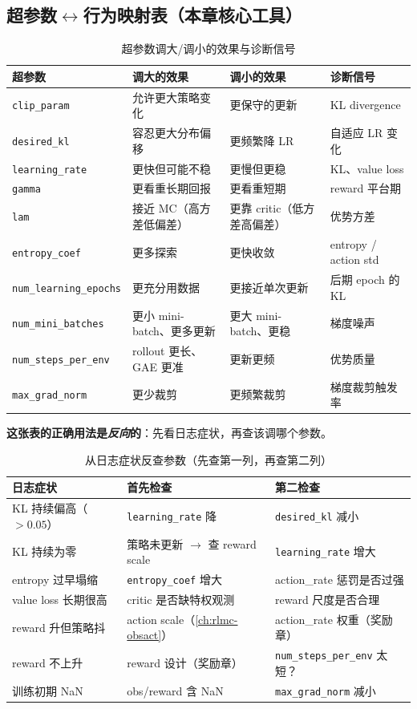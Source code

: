 \subsection{超参数\texorpdfstring{$\leftrightarrow$}{<->}行为映射表（本章核心工具）}

\begin{table}[H]
\centering
\caption{超参数调大/调小的效果与诊断信号}
\label{tab:rlmc-param-behavior}
\begin{tabular}{p{2.6cm}p{3.0cm}p{3.0cm}p{2.6cm}}
\hline
超参数 & 调大的效果 & 调小的效果 & 诊断信号 \\
\hline
\verb|clip_param| & 允许更大策略变化 & 更保守的更新 & KL divergence \\
\verb|desired_kl| & 容忍更大分布偏移 & 更频繁降 LR & 自适应 LR 变化 \\
\verb|learning_rate| & 更快但可能不稳 & 更慢但更稳 & KL、value loss \\
\verb|gamma| & 更看重长期回报 & 更看重短期 & reward 平台期 \\
\verb|lam| & 接近 MC（高方差低偏差） & 更靠 critic（低方差高偏差） & 优势方差 \\
\verb|entropy_coef| & 更多探索 & 更快收敛 & entropy / action std \\
\verb|num_learning_epochs| & 更充分用数据 & 更接近单次更新 & 后期 epoch 的 KL \\
\verb|num_mini_batches| & 更小 mini-batch、更多更新 & 更大 mini-batch、更稳 & 梯度噪声 \\
\verb|num_steps_per_env| & rollout 更长、GAE 更准 & 更新更频 & 优势质量 \\
\verb|max_grad_norm| & 更少裁剪 & 更频繁裁剪 & 梯度裁剪触发率 \\
\hline
\end{tabular}
\end{table}

\textbf{这张表的正确用法是\emph{反向}的}：先看日志症状，再查该调哪个参数。

\begin{table}[H]
\centering
\caption{从日志症状反查参数（先查第一列，再查第二列）}
\label{tab:rlmc-symptom-param}
\begin{tabular}{p{4.0cm}p{3.4cm}p{3.4cm}}
\hline
日志症状 & 首先检查 & 第二检查 \\
\hline
KL 持续偏高（$>0.05$） & \verb|learning_rate| 降 & \verb|desired_kl| 减小 \\
KL 持续为零 & 策略未更新 $\to$ 查 reward scale & \verb|learning_rate| 增大 \\
entropy 过早塌缩 & \verb|entropy_coef| 增大 & action\_rate 惩罚是否过强 \\
value loss 长期很高 & critic 是否缺特权观测 & reward 尺度是否合理 \\
reward 升但策略抖 & action scale（\cref{ch:rlmc-obsact}） & action\_rate 权重（奖励章） \\
reward 不上升 & reward 设计（奖励章） & \verb|num_steps_per_env| 太短？ \\
训练初期 NaN & obs/reward 含 NaN & \verb|max_grad_norm| 减小 \\
\hline
\end{tabular}
\end{table}

